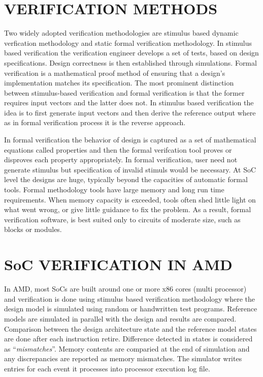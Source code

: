 \section{VERIFICATION METHODS}
Two widely adopted verification methodologies are stimulus based dynamic verfication methodology and static formal verification methodology. In stimulus based verification the verification engineer develops a set of tests, based on design specifications. Design correctness is then established through simulations. Formal verification is a mathematical proof method of ensuring that a design's implementation matches its specification. The most prominent distinction between stimulus-based verification and formal verification is that the former requires input vectors and the latter does not. In stimulus based verification the idea is to first generate input vectors and then derive the reference output where as in formal verification process it is the reverse approach.

In formal verification the behavior of design is captured as a set of mathematical equations called properties and then the formal verifcation tool proves or disproves each property appropriately. In formal verification, user need not generate stimulus but specification of invalid stimuls would be necessary.  At SoC level the designs are huge, typically beyond the capacities of automatic formal tools. Formal methodology tools have large memory and long run time requirements. When memory capacity is exceeded, tools often shed little light on what went wrong, or give little guidance to fix the problem. As a result, formal verification software, is best suited only to circuits of moderate size, such as blocks or modules. 

\section{SoC VERIFICATION IN AMD}
In AMD, most SoCs are built around one or more x86 cores (multi processor) and verification is done using stimulus based verification methodology where the design model is simulated using random or handwritten test programs. Reference models are simulated in parallel with the design and results are compared.  Comparison between the design architecture state and the reference model states are done after each instruction retire. Difference detected in states is considered as ``{\it mismatches}''. Memory contents are comparied at the end of simulation and any discrepancies are reported as memory mismatches.  The simulator writes entries for each event it processes into processor execution log file. 


